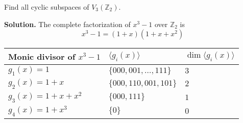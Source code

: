 \begin{exbox}
    \begin{example}
        Find all cyclic subspaces of $ V_3(\mathbb{Z}_2) $.

        \textbf{Solution.} The complete factorization
        of $ x^3-1 $ over $ \mathbb{Z}_2 $ is
        \[ x^3-1=(1+x)(1+x+x^2) \]

        \begin{table}[H]
            \centering
            \begin{tabularx}{0.8\linewidth}{@{}YYY@{}}
                Monic divisor of $ x^3-1 $ & $ \langle g_i(x) \rangle $  & $ \dim \langle g_i(x) \rangle $ \\
                \midrule
                \midrule
                $ g_1(x)=1 $               & $ \{000,001,\ldots ,111\} $ & $ 3 $                           \\
                \midrule
                $ g_2(x)=1+x $             & $ \{000,110,001,101\} $     & $ 2 $                           \\
                \midrule
                $ g_3(x)=1+x+x^2 $         & $ \{000,111\} $             & $ 1 $                           \\
                \midrule
                $ g_4(x)=1+x^3 $           & $ \{0\} $                   & $ 0 $                           \\
            \end{tabularx}
        \end{table}
    \end{example}
\end{exbox}
